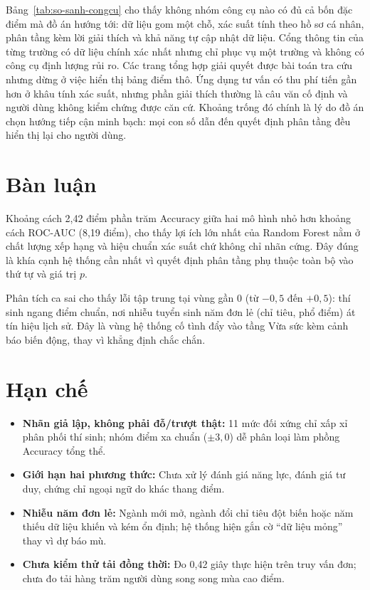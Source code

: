 Bảng~\ref{tab:so-sanh-congcu} cho thấy không nhóm công cụ nào có đủ cả bốn đặc điểm
mà đồ án hướng tới: dữ liệu gom một chỗ, xác suất tính theo hồ sơ cá nhân, phân tầng
kèm lời giải thích và khả năng tự cập nhật dữ liệu. Cổng thông tin của từng trường có
dữ liệu chính xác nhất nhưng chỉ phục vụ một trường và không có công cụ định lượng
rủi ro. Các trang tổng hợp giải quyết được bài toán tra cứu nhưng dừng ở việc hiển thị
bảng điểm thô. Ứng dụng tư vấn có thu phí tiến gần hơn ở khâu tính xác suất, nhưng
phần giải thích thường là câu văn cố định và người dùng không kiểm chứng được căn cứ.
Khoảng trống đó chính là lý do đồ án chọn hướng tiếp cận minh bạch: mọi con số dẫn
đến quyết định phân tầng đều hiển thị lại cho người dùng.

\section{Bàn luận}

Khoảng cách 2,42 điểm phần trăm Accuracy giữa hai mô hình nhỏ hơn khoảng cách ROC-AUC
(8,19 điểm), cho thấy lợi ích lớn nhất của Random Forest nằm ở chất lượng xếp hạng và
hiệu chuẩn xác suất chứ không chỉ nhãn cứng. Đây đúng là khía cạnh hệ thống cần nhất
vì quyết định phân tầng phụ thuộc toàn bộ vào thứ tự và giá trị $p$.

Phân tích ca sai cho thấy lỗi tập trung tại vùng  gần 0 (từ $-0{,}5$ đến
$+0{,}5$): thí sinh ngang điểm chuẩn, nơi nhiễu tuyển sinh năm đơn lẻ (chỉ tiêu, phổ
điểm) át tín hiệu lịch sử. Đây là vùng hệ thống cố tình đẩy vào tầng Vừa sức kèm cảnh
báo biến động, thay vì khẳng định chắc chắn.

\section{Hạn chế}

\begin{itemize}[leftmargin=1.6em, itemsep=2pt]
  \item \textbf{Nhãn giả lập, không phải đỗ/trượt thật:} 11 mức  đối xứng chỉ xấp xỉ phân phối thí sinh; nhóm điểm xa chuẩn ($\pm 3{,}0$) dễ phân loại làm phồng Accuracy tổng thể.
  \item \textbf{Giới hạn hai phương thức:} Chưa xử lý đánh giá năng lực, đánh giá tư duy, chứng chỉ ngoại ngữ do khác thang điểm.
  \item \textbf{Nhiễu năm đơn lẻ:} Ngành mới mở, ngành đổi chỉ tiêu đột biến hoặc năm thiếu dữ liệu khiến  và  kém ổn định; hệ thống hiện gắn cờ ``dữ liệu mỏng'' thay vì dự báo mù.
  \item \textbf{Chưa kiểm thử tải đồng thời:} Đo 0,42 giây thực hiện trên truy vấn đơn; chưa đo tải hàng trăm người dùng song song mùa cao điểm.
\end{itemize}

